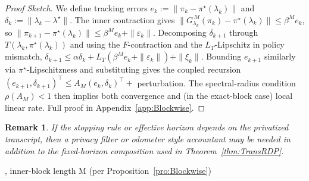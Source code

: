 \documentclass{article}
\newtheorem{remark}{Remark}
\begin{document}
\begin{proof}
    [Proof Sketch]
    We define tracking errors $e_k := \|\pi_k - \pi^\star(\lambda_k)\|$ and $\delta_k := \|\lambda_k - \lambda^\star\|$. The inner contraction gives $\|G_{\lambda_k}^{\,M}(\pi_k) - \pi^\star(\lambda_k)\| \le \beta^M e_k$, so $\|\pi_{k+1} - \pi^\star(\lambda_k)\| \le \beta^M e_k + \|\varepsilon_k\|$. Decomposing $\delta_{k+1}$ through $T(\lambda_k, \pi^\star(\lambda_k))$ and using the $F$-contraction and the $L_T$-Lipschitz in policy mismatch, $\delta_{k+1} \le \alpha\delta_k + L_T(\beta^M e_k + \|\varepsilon_k\|) + \|\xi_k\|$. Bounding $e_{k+1}$ similarly via $\pi^\star$-Lipschitzness and substituting gives the coupled recursion $(e_{k+1}, \delta_{k+1})^\top \le A_M (e_k, \delta_k)^\top + $ perturbation. The spectral-radius condition $\rho(A_M) < 1$ then implies both convergence and (in the exact-block case) local linear rate. Full proof in Appendix~\ref{app:Blockwise}.
\end{proof}

\begin{remark}
    If the stopping rule or effective horizon depends on the privatized transcript, then a privacy filter or odometer style accountant may be needed in addition to the fixed-horizon composition used in Theorem~\ref{thm:TransRDP}.
\end{remark}

\begin{algorithm}[t]
\caption{PIL-APS: Outer Privacy-Pricing Game with Inner MARL}
\label{alg:pil}
, inner-block length M (per Proposition~\ref{pro:Blockwise})
\end{algorithm}
\end{document}

